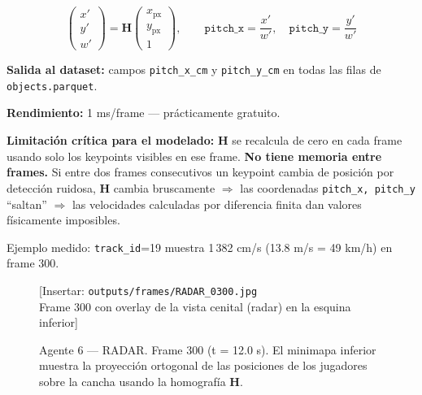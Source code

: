 \documentclass[11pt,a4paper]{article}
\begin{document}
\begin{equation}
  \begin{pmatrix} x' \\ y' \\ w' \end{pmatrix}
  = \mathbf{H}
  \begin{pmatrix} x_\text{px} \\ y_\text{px} \\ 1 \end{pmatrix},
  \qquad
  \texttt{pitch\_x} = \frac{x'}{w'}, \quad
  \texttt{pitch\_y} = \frac{y'}{w'}
  \label{eq:homografia}
\end{equation}

\textbf{Salida al dataset:} campos \texttt{pitch\_x\_cm} y \texttt{pitch\_y\_cm}
en todas las filas de \texttt{objects.parquet}.

\textbf{Rendimiento:} 1 ms/frame — prácticamente gratuito.

\begin{alertbox}
\textbf{Limitación crítica para el modelado:}
$\mathbf{H}$ se recalcula de cero en cada frame usando solo los keypoints
visibles en ese frame. \textbf{No tiene memoria entre frames.}
Si entre dos frames consecutivos un keypoint cambia de posición por detección
ruidosa, $\mathbf{H}$ cambia bruscamente $\Rightarrow$ las coordenadas
\texttt{pitch\_x, pitch\_y} ``saltan'' $\Rightarrow$ las velocidades calculadas
por diferencia finita dan valores físicamente imposibles.

Ejemplo medido: \texttt{track\_id}=19 muestra 1\,382 cm/s (13.8 m/s = 49 km/h)
en frame 300.
\end{alertbox}

\begin{figure}[H]
  \centering
  \begin{mdframed}[
    linecolor=gray!40, linewidth=1pt,
    innertopmargin=50pt, innerbottommargin=50pt,
    backgroundcolor=gray!8
  ]
    \centering\color{gray!60}
    [Insertar: \texttt{outputs/frames/RADAR\_0300.jpg} \\
    Frame 300 con overlay de la vista cenital (radar) en la esquina inferior]
  \end{mdframed}
  \caption{Agente 6 — RADAR. Frame 300 (t = 12.0 s). El minimapa inferior
           muestra la proyección ortogonal de las posiciones de los jugadores
           sobre la cancha usando la homografía $\mathbf{H}$.}
  \label{fig:radar}
\end{figure}
\end{document}

